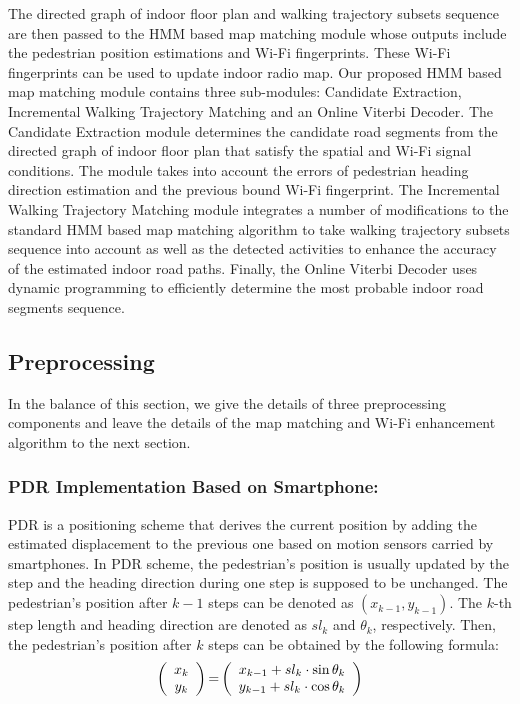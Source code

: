 \documentclass{llncs}
\begin{document}
The directed graph of indoor floor plan and walking trajectory subsets sequence are then passed to the HMM based map matching module whose outputs include the pedestrian position estimations and Wi-Fi fingerprints. These Wi-Fi fingerprints can be used to update indoor radio map. Our proposed HMM based map matching module contains three sub-modules: Candidate Extraction, Incremental Walking Trajectory Matching and an Online Viterbi Decoder. The Candidate Extraction module determines the candidate road segments from the directed graph of indoor floor plan that satisfy the spatial and Wi-Fi signal conditions. The module takes into account the errors of pedestrian heading direction estimation and the previous bound Wi-Fi fingerprint. The Incremental Walking Trajectory Matching module integrates a number of modifications to the standard HMM based map matching algorithm to take walking trajectory subsets sequence into account as well as the detected activities to enhance the accuracy of the estimated indoor road paths. Finally, the Online Viterbi Decoder uses dynamic programming to efficiently determine the most probable indoor road segments sequence.

\subsection{Preprocessing}

In the balance of this section, we give the details of three preprocessing components and leave the details of the map matching and Wi-Fi enhancement algorithm to the next section.

\subsubsection{PDR Implementation Based on Smartphone:}

PDR is a positioning scheme that derives the current position by adding the estimated displacement to the previous one based on motion sensors carried by smartphones. In PDR scheme, the pedestrian's position is usually updated by the step and the heading direction during one step is supposed to be unchanged. The pedestrian's position after $k-1$ steps can be denoted as $(x_{k-1},y_{k-1})$. The $k$-th step length and heading direction are denoted as $sl_k$ and $\theta_k$, respectively. Then, the pedestrian's position after $k$ steps can be obtained by the following formula:
\begin{equation}
\label{equ_pdr}
\left( {\begin{array}{*{20}{c}}
	{{x_k}}\\
	{{y_k}}
	\end{array}} \right){\rm{ = }}\left( {\begin{array}{*{20}{c}}
	{{x_{k - 1}} + s{l_k} \cdot \sin {\theta _k}}\\
	{{y_{k - 1}} + s{l_k} \cdot \cos {\theta _k}}
	\end{array}} \right)
\end{equation}
\end{document}
